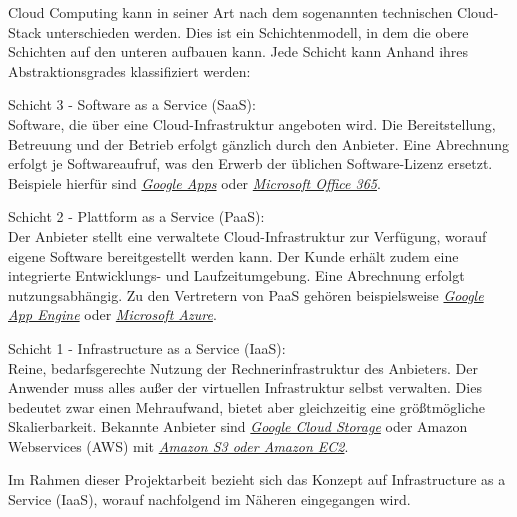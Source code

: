 \documentclass[12pt,a4paper,bibliography=totocnumbered,listof=totocnumbered]{scrartcl}
\begin{document}
Cloud Computing kann in seiner Art nach dem sogenannten technischen Cloud-Stack unterschieden werden. Dies ist ein Schichtenmodell, in dem die obere Schichten auf den unteren aufbauen kann. Jede Schicht kann Anhand ihres Abstraktionsgrades klassifiziert werden:

\begin{compactitem}
\item Schicht 3 - Software as a Service (SaaS):\\
Software, die über eine Cloud-Infrastruktur angeboten wird. Die Bereitstellung, Betreuung und der Betrieb erfolgt gänzlich durch den Anbieter. Eine Abrechnung erfolgt je Softwareaufruf, was den Erwerb der üblichen Software-Lizenz ersetzt. Beispiele hierfür sind \href{http://www.google.com/enterprise/apps/business/}{\textit{Google Apps}} oder \href{http://office.microsoft.com/de-de/business/was-ist-office-365-fur-unternehmen-FX102997580.aspx}{\textit{Microsoft Office 365}}.
\item Schicht 2 - Plattform as a Service (PaaS):\\
Der Anbieter stellt eine verwaltete Cloud-Infrastruktur zur Verfügung, worauf eigene Software bereitgestellt werden kann. Der Kunde erhält zudem eine integrierte Entwicklungs- und Laufzeitumgebung. Eine Abrechnung erfolgt nutzungsabhängig. Zu den Vertretern von PaaS gehören beispielsweise \href{https://cloud.google.com/appengine/}{\textit{Google App Engine}} oder \href{http://azure.microsoft.com/de-de/}{\textit{Microsoft Azure}}.
\item Schicht 1 - Infrastructure as a Service (IaaS):\\
Reine, bedarfsgerechte Nutzung der Rechnerinfrastruktur des Anbieters. Der Anwender muss alles außer der virtuellen Infrastruktur selbst verwalten. Dies bedeutet zwar einen Mehraufwand, bietet aber gleichzeitig eine größtmögliche Skalierbarkeit. Bekannte Anbieter sind \href{https://cloud.google.com/storage/}{\textit{Google Cloud Storage}} oder Amazon Webservices (AWS) mit \href{http://aws.amazon.com/de/}{\textit{Amazon S3 oder Amazon EC2}}.
\end{compactitem}

Im Rahmen dieser Projektarbeit bezieht sich das Konzept auf Infrastructure as a Service (IaaS), worauf nachfolgend im Näheren eingegangen wird.
\end{document}

